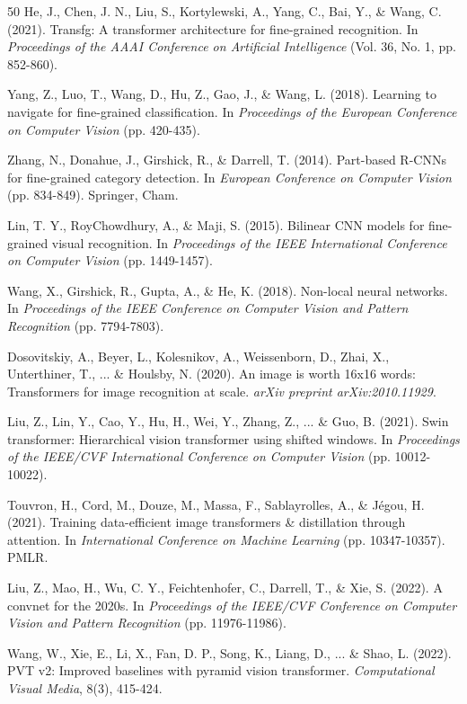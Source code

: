 \documentclass[pdflatex,sn-mathphys-num]{sn-jnl}
\theoremstyle{thmstyleone}%
\theoremstyle{thmstyletwo}%
\theoremstyle{thmstylethree}%
\begin{document}
\begin{thebibliography}{50}
 He, J., Chen, J. N., Liu, S., Kortylewski, A., Yang, C., Bai, Y., \& Wang, C. (2021). Transfg: A transformer architecture for fine-grained recognition. In \textit{Proceedings of the AAAI Conference on Artificial Intelligence} (Vol. 36, No. 1, pp. 852-860).

 Yang, Z., Luo, T., Wang, D., Hu, Z., Gao, J., \& Wang, L. (2018). Learning to navigate for fine-grained classification. In \textit{Proceedings of the European Conference on Computer Vision} (pp. 420-435).

 Zhang, N., Donahue, J., Girshick, R., \& Darrell, T. (2014). Part-based R-CNNs for fine-grained category detection. In \textit{European Conference on Computer Vision} (pp. 834-849). Springer, Cham.

 Lin, T. Y., RoyChowdhury, A., \& Maji, S. (2015). Bilinear CNN models for fine-grained visual recognition. In \textit{Proceedings of the IEEE International Conference on Computer Vision} (pp. 1449-1457).

 Wang, X., Girshick, R., Gupta, A., \& He, K. (2018). Non-local neural networks. In \textit{Proceedings of the IEEE Conference on Computer Vision and Pattern Recognition} (pp. 7794-7803).

 Dosovitskiy, A., Beyer, L., Kolesnikov, A., Weissenborn, D., Zhai, X., Unterthiner, T., ... \& Houlsby, N. (2020). An image is worth 16x16 words: Transformers for image recognition at scale. \textit{arXiv preprint arXiv:2010.11929}.

 Liu, Z., Lin, Y., Cao, Y., Hu, H., Wei, Y., Zhang, Z., ... \& Guo, B. (2021). Swin transformer: Hierarchical vision transformer using shifted windows. In \textit{Proceedings of the IEEE/CVF International Conference on Computer Vision} (pp. 10012-10022).

 Touvron, H., Cord, M., Douze, M., Massa, F., Sablayrolles, A., \& Jégou, H. (2021). Training data-efficient image transformers \& distillation through attention. In \textit{International Conference on Machine Learning} (pp. 10347-10357). PMLR.

 Liu, Z., Mao, H., Wu, C. Y., Feichtenhofer, C., Darrell, T., \& Xie, S. (2022). A convnet for the 2020s. In \textit{Proceedings of the IEEE/CVF Conference on Computer Vision and Pattern Recognition} (pp. 11976-11986).

 Wang, W., Xie, E., Li, X., Fan, D. P., Song, K., Liang, D., ... \& Shao, L. (2022). PVT v2: Improved baselines with pyramid vision transformer. \textit{Computational Visual Media}, 8(3), 415-424.


\end{thebibliography}
\end{document}

